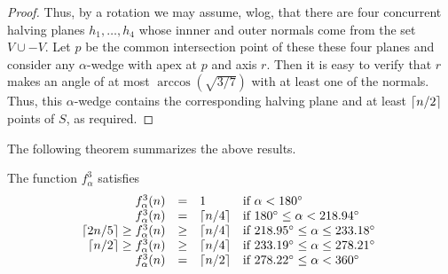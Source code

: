 \documentclass[lotsofwhite]{patmorin}
\begin{document}
\begin{proof}
Thus, by a rotation we may assume, wlog, that there are four
concurrent halving planes $h_1,\ldots,h_4$ whose innner and outer
normals come from the set $V\cup -V$.  Let $p$ be the common
intersection point of these these four planes and consider any
$\alpha$-wedge with apex at $p$ and axis $r$.  Then it is easy to
verify that $r$ makes an angle of at most $\arccos(\sqrt{3/7})$ with
at least one of the normals.  Thus, this $\alpha$-wedge contains the
corresponding halving plane and at least $\left\lceil n/2 \right\rceil$ points of $S$,
as required.
\end{proof}







The following theorem summarizes the above results.

\begin{thm}
The function $f_\alpha^3$ satisfies
\[\begin{array}{rcll}
  f^3_\alpha(n) & = & 1 & \mbox{if $\alpha < 180^\circ$} \\
  f^3_\alpha(n) & = & \left\lceil n/4 \right\rceil & 
    \mbox{if $180^\circ \le \alpha < 218.94^\circ$} \\
\left\lceil 2n/5 \right\rceil\ge  f^3_\alpha(n) & \ge & \left\lceil n/4 \right\rceil & 
    \mbox{if $218.95^\circ \le \alpha \le 233.18^\circ$ } \\
\left\lceil n/2 \right\rceil\ge  f^3_\alpha(n) & \ge & \left\lceil n/4 \right\rceil & 
    \mbox{if $233.19^\circ \le \alpha \le 278.21^\circ$ } \\
  f^3_\alpha(n) & = & \left\lceil n/2 \right\rceil & 
    \mbox{if $278.22^\circ\le \alpha < 360^\circ$} \\
\end{array}\]
\end{thm}
\end{document}
